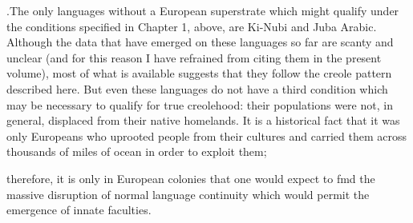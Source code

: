 .The only languages without a European superstrate which might qualify under the conditions specified in Chapter 1, above, are Ki-Nubi and Juba Arabic. Although the data that have emerged on these lan\-guages so far are scanty and unclear (and for this reason I have refrained from citing them in the present volume), most of what is available suggests that they follow the creole pattern described here. But even these languages do not have a third condition which may be necessary to qualify for true creolehood: their populations were not, in general, displaced from their native homelands. It is a historical fact that it was only Europeans who uprooted people from their cultures and carried them across thousands of miles of ocean in order to exploit them;


therefore, it is only in European colonies that one would expect to fmd the massive disruption of normal language continuity which would permit the emergence of innate faculties.

